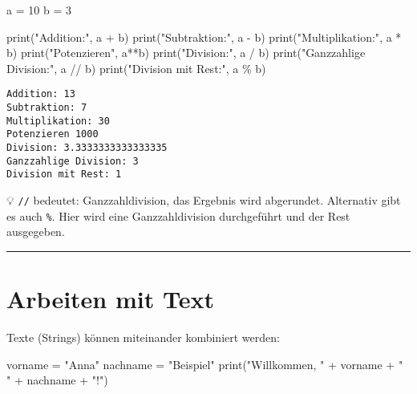 \documentclass[
  letterpaper,
  DIV=11,
  numbers=noendperiod]{scrreprt}
\newenvironment{Shaded}{\begin{snugshade}}{\end{snugshade}}
\newcommand{\BuiltInTok}[1]{\textcolor[rgb]{0.00,0.23,0.31}{#1}}
\newcommand{\DecValTok}[1]{\textcolor[rgb]{0.68,0.00,0.00}{#1}}
\newcommand{\NormalTok}[1]{\textcolor[rgb]{0.00,0.23,0.31}{#1}}
\newcommand{\OperatorTok}[1]{\textcolor[rgb]{0.37,0.37,0.37}{#1}}
\newcommand{\StringTok}[1]{\textcolor[rgb]{0.13,0.47,0.30}{#1}}
\begin{document}
\begin{Shaded}
\begin{Highlighting}[]
\NormalTok{a }\OperatorTok{=} \DecValTok{10}
\NormalTok{b }\OperatorTok{=} \DecValTok{3}

\BuiltInTok{print}\NormalTok{(}\StringTok{"Addition:"}\NormalTok{, a }\OperatorTok{+}\NormalTok{ b)}
\BuiltInTok{print}\NormalTok{(}\StringTok{"Subtraktion:"}\NormalTok{, a }\OperatorTok{{-}}\NormalTok{ b)}
\BuiltInTok{print}\NormalTok{(}\StringTok{"Multiplikation:"}\NormalTok{, a }\OperatorTok{*}\NormalTok{ b)}
\BuiltInTok{print}\NormalTok{(}\StringTok{"Potenzieren"}\NormalTok{, a}\OperatorTok{**}\NormalTok{b)}
\BuiltInTok{print}\NormalTok{(}\StringTok{"Division:"}\NormalTok{, a }\OperatorTok{/}\NormalTok{ b)}
\BuiltInTok{print}\NormalTok{(}\StringTok{"Ganzzahlige Division:"}\NormalTok{, a }\OperatorTok{//}\NormalTok{ b)}
\BuiltInTok{print}\NormalTok{(}\StringTok{"Division mit Rest:"}\NormalTok{, a }\OperatorTok{\%}\NormalTok{ b)}
\end{Highlighting}
\end{Shaded}

\begin{verbatim}
Addition: 13
Subtraktion: 7
Multiplikation: 30
Potenzieren 1000
Division: 3.3333333333333335
Ganzzahlige Division: 3
Division mit Rest: 1
\end{verbatim}

💡 \texttt{//} bedeutet: Ganzzahldivision, das Ergebnis wird abgerundet.
Alternativ gibt es auch \texttt{\%}. Hier wird eine Ganzzahldivision
durchgeführt und der Rest ausgegeben.

\begin{center}\rule{0.5\linewidth}{0.5pt}\end{center}

\section{Arbeiten mit Text}\label{arbeiten-mit-text}

Texte (Strings) können miteinander kombiniert werden:

\begin{Shaded}
\begin{Highlighting}[]
\NormalTok{vorname }\OperatorTok{=} \StringTok{"Anna"}
\NormalTok{nachname }\OperatorTok{=} \StringTok{"Beispiel"}
\BuiltInTok{print}\NormalTok{(}\StringTok{"Willkommen, "} \OperatorTok{+}\NormalTok{ vorname }\OperatorTok{+} \StringTok{" "} \OperatorTok{+}\NormalTok{ nachname }\OperatorTok{+} \StringTok{"!"}\NormalTok{)}
\end{Highlighting}
\end{Shaded}
\end{document}

